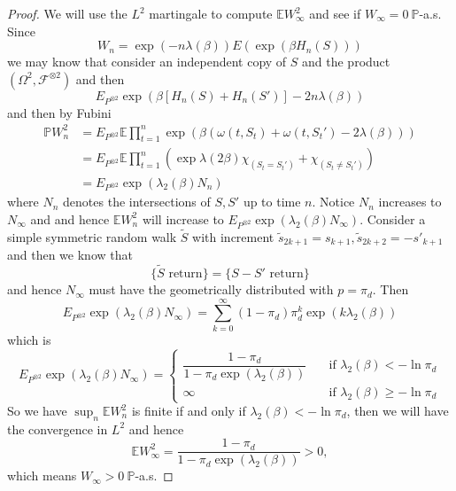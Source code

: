 \begin{proof}
    We will use the $L^2$ martingale to compute $\mathbb{E} W_{\infty}^2$ and see if $W_{\infty} = 0\ \mathbb{P}$-a.s. Since
    \[
    W_n = \exp{(-n\lambda(\beta))}E(\exp{(\beta H_n(S))})
    \] 
    we may know that consider an independent copy of $S$ and the product $(\Omega^2, \mathcal{F}^{\otimes 2})$ and then
    \[
    E_{P^{\otimes 2}}\exp{\left(\beta\left[H_n(S) + H_n(S')\right]-2n\lambda(\beta)\right)}
    \]
    and then by Fubini
    \[
    \begin{aligned}
    \mathbb{P}W_n^2 &= E_{P^{\otimes 2}} \mathbb{E} \prod_{t=1}^n \exp{\left( \beta(\omega(t,S_t)+\omega(t,S_t')-2\lambda(\beta))\right)} \\
    &= E_{P^{\otimes 2}} \mathbb{E} \prod_{t=1}^n \left(\exp{\lambda(2\beta)}\chi_{(S_t = S_t')} + \chi_{(S_t \neq S_t')}\right) \\
    &= E_{P^{\otimes 2}} \exp{\left(\lambda_2(\beta) N_n\right)}
    \end{aligned}
    \]
    where $N_n$ denotes the intersections of $S,S'$ up to time $n$. Notice $N_n$ increases to $N_{\infty}$ and and hence $\mathbb{E}W_n^2$ will increase to $E_{P^{\otimes 2}} \exp{\left(\lambda_2(\beta) N_{\infty}\right)}$. Consider a simple symmetric random walk $\tilde{S}$ with increment $\tilde{s}_{2k+1} = s_{k+1}, \tilde{s}_{2k+2} = -s'_{k+1}$ and then we know that
    \[
    \{\tilde{S}\text{ return}\} = \{S-S'\text{ return}\}
    \]
    and hence $N_{\infty}$ must have the geometrically distributed with $p = \pi_d$. Then
    \[
    E_{P^{\otimes 2}} \exp{\left(\lambda_2(\beta) N_{\infty}\right)} = \sum\limits_{k=0}^{\infty}(1-\pi_d)\pi_d^k \exp{(k\lambda_2(\beta))}
    \]
    which is
    \[E_{P^{\otimes 2}} \exp{\left(\lambda_2(\beta) N_{\infty}\right)}  =
    \begin{cases}
        \dfrac{1-\pi_d}{1-\pi_d\exp{(\lambda_2(\beta))}}\quad&\text{if }\lambda_2(\beta) < -\ln \pi_d \\
        \infty&\text{if }\lambda_2(\beta) \geq -\ln \pi_d
    \end{cases}
    \]
    So we have $\sup_n \mathbb{E}W_n^2$ is finite if and only if $\lambda_2(\beta) < -\ln \pi_d$, then we will have the convergence in $L^2$ and hence \[\mathbb{E} W_{\infty}^2 = \dfrac{1-\pi_d}{1-\pi_d\exp(\lambda_2(\beta))} > 0,\] which means $W_{\infty} > 0\ \mathbb{P}$-a.s.
\end{proof}

